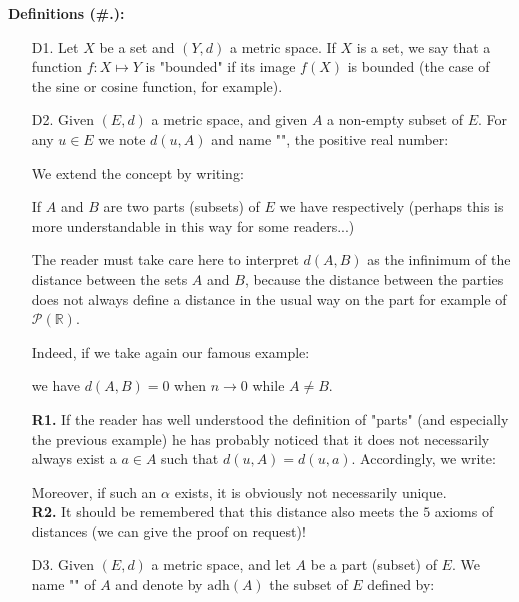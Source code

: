 	\textbf{Definitions (\#\thesection.\mydef):}
	\begin{enumerate}
		\item[D1.] Let $X$ be a set and $(Y,d)$ a metric space. If $X$ is a set, we say that a function $f: X\mapsto Y$ is "bounded" if its image $f (X)$ is bounded (the case of the sine or cosine function, for example).
		
		\item[D2.] Given $(E, d)$ a metric space, and given $A$ a non-empty subset of $E$. For any $u\in E$ we note $d(u, A)$ and name "", the positive real number:
		
		We extend the concept by writing:
		
		If $A$ and $B$ are two parts (subsets) of $E$ we have respectively (perhaps this is more understandable in this way for some readers...)
		
		The reader must take care here to interpret $d(A,B)$ as the infinimum of the distance between the sets $A$ and $B$, because the distance between the parties does not always define a distance in the usual way on the part for example of $\mathcal{P}(\mathbb{R})$.
		
		Indeed, if we take again our famous example:
			
	 	we have $d(A,B)=0$ when $n \rightarrow 0$ while $A\neq B$.
	 	\begin{tcolorbox}[title=Remarks,arc=10pt,breakable,drop lifted shadow,
  skin=enhanced,
  skin first is subskin of={enhancedfirst}{arc=10pt,no shadow},
  skin middle is subskin of={enhancedmiddle}{arc=10pt,no shadow},
  skin last is subskin of={enhancedlast}{drop lifted shadow}]
		\textbf{R1.} If the reader has well understood the definition of "parts" (and especially the previous example) he has probably noticed that it does not necessarily always exist a $a\in A$ such that $d(u,A)=d(u,a)$. Accordingly, we write:
		
		Moreover, if such an $\alpha$ exists, it is obviously not necessarily unique.\\
		
		\textbf{R2.} It should be remembered that this distance also meets the $5$ axioms of distances (we can give the proof on request)!
		\end{tcolorbox}	
	
		\item[D3.] Given $(E, d)$ a metric space, and let $A$ be a part (subset) of $E$. We name "" of $A$ and denote by $\text{adh} (A)$ the subset of $E$ defined by:
		

\end{enumerate}
